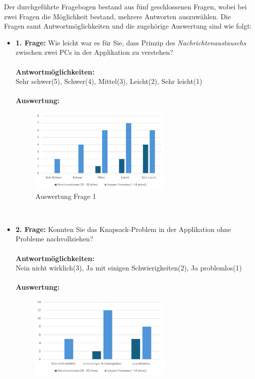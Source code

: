 Der durchgeführte Fragebogen bestand aus fünf geschlossenen Fragen, wobei bei zwei Fragen die Möglichkeit bestand, mehrere
Antworten auszuwählen. Die Fragen samt Antwortmöglichkeiten und die zugehörige Auswertung sind wie folgt:
\begin{itemize}
    \item \textbf{1. Frage:} Wie leicht war es für Sie, dass Prinzip des \textit{Nachrichtenaustauschs} zwischen zwei PCs in der Applikation zu verstehen?
    \\
    \\
    \textbf{Antwortmöglichkeiten:} \\
    Sehr schwer(5), Schwer(4), Mittel(3), Leicht(2), Sehr leicht(1)
    \\
    \\
    \textbf{Auswertung:}
    \begin{figure}[h]
        \centering
        \includegraphics[width=0.65\textwidth]{images/AuswertungFrage1}
        \caption{Auswertung Frage 1}
        \label{fig:fr1}
    \end{figure}
    \\
    \item \textbf{2. Frage:} Konnten Sie das Knapsack-Problem in der Applikation ohne Probleme nachvollziehen?
    \\
    \\
    \textbf{Antwortmöglichkeiten:}\\
    Nein nicht wirklich(3), Ja mit einigen Schwierigkeiten(2), Ja problemlos(1)
    \\
    \\
    \textbf{Auswertung:}
    \begin{figure}[h]
        \centering
        \includegraphics[width=0.65\textwidth]{images/AuswertungFrage2}

\end{figure}
\end{itemize}
